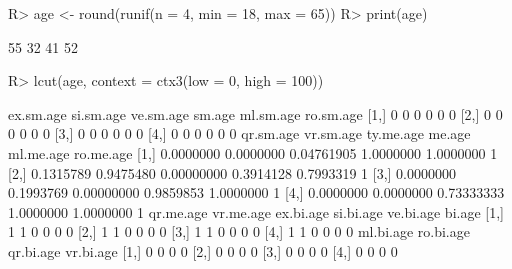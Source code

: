 \begin{Schunk}
% --begin: "lcut.numeric"
\begin{Sinput}
R> age <- round(runif(n = 4, min = 18, max = 65))
R> print(age)
\end{Sinput}
\begin{Soutput}
[1] 55 32 41 52
\end{Soutput}
\begin{Sinput}
R> lcut(age, context = ctx3(low = 0, high = 100))
\end{Sinput}
\begin{Soutput}
     ex.sm.age si.sm.age ve.sm.age sm.age ml.sm.age ro.sm.age
[1,]         0         0         0      0         0         0
[2,]         0         0         0      0         0         0
[3,]         0         0         0      0         0         0
[4,]         0         0         0      0         0         0
     qr.sm.age vr.sm.age  ty.me.age    me.age ml.me.age ro.me.age
[1,] 0.0000000 0.0000000 0.04761905 1.0000000 1.0000000         1
[2,] 0.1315789 0.9475480 0.00000000 0.3914128 0.7993319         1
[3,] 0.0000000 0.1993769 0.00000000 0.9859853 1.0000000         1
[4,] 0.0000000 0.0000000 0.73333333 1.0000000 1.0000000         1
     qr.me.age vr.me.age ex.bi.age si.bi.age ve.bi.age bi.age
[1,]         1         1         0         0         0      0
[2,]         1         1         0         0         0      0
[3,]         1         1         0         0         0      0
[4,]         1         1         0         0         0      0
     ml.bi.age ro.bi.age qr.bi.age vr.bi.age
[1,]         0         0         0         0
[2,]         0         0         0         0
[3,]         0         0         0         0
[4,]         0         0         0         0
\end{Soutput}
%
% --end: "lcut.numeric"
\end{Schunk}
